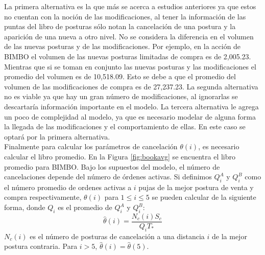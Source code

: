 \documentclass[11pt]{article}
\numberwithin{equation}{section} %
\begin{document}
La primera alternativa es la que más se acerca a estudios anteriores ya que estos no cuentan con la noción de las modificaciones, al tener la información de las puntas del libro de posturas sólo notan la cancelación de una postura y la aparición de una nueva a otro nivel. No se considera la diferencia en el volumen de las nuevas posturas y de las modificaciones. Por ejemplo, en la acción de BIMBO el volumen de las nuevas posturas limitadas de compra es de 2,005.23. Mientras que si se toman en conjunto las nuevas posturas y las modificaciones el promedio del volumen es de 10,518.09. Esto se debe a que el promedio del volumen de las modificaciones de compra es de 27,237.23. La segunda alternativa no es viable ya que hay un gran número de modificaciones, al ignorarlas se descartaría información importante en el modelo. La tercera alternativa le agrega un poco de complejidad al modelo, ya que es necesario modelar de alguna forma la llegada de las modificaciones y el comportamiento de ellas. En este caso se optará por la primera alternativa.\\

Finalmente para calcular los parámetros de cancelación $\theta(i)$, es necesario calcular el libro promedio. En la Figura \ref{fig:bookavg} se encuentra el libro promedio para BIMBO. Bajo los supuestos del modelo, el número de cancelaciones depende del número de órdenes activas. Si definimos $Q_i^A$ y $Q_i^B$ como el número promedio de ordenes activas a $i$ pujas de la mejor postura de venta y compra respectivamente,  $\theta(i)$ para $1\leq i \leq 5$ se pueden calcular de la siguiente forma, donde $Q_i$ es el promedio de $Q_i^A$ y $Q_i^B$:
\[
\hat{\theta}(i)=\frac{N_c(i) S_c}{Q_i T_*}
\]
$N_c(i)$ es el número de posturas de cancelación a una distancia $i$ de la mejor postura contraria. Para $i>5$, $\hat{\theta}(i)=\hat{\theta}(5)$.
\end{document}
